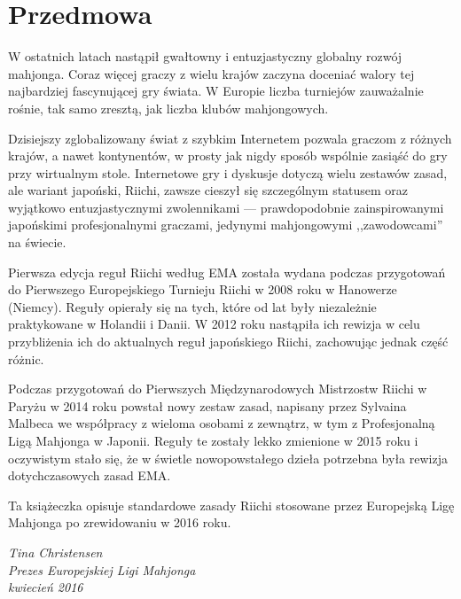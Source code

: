 \section*{Przedmowa}

W ostatnich latach nastąpił gwałtowny i entuzjastyczny globalny rozwój mahjonga.
Coraz więcej graczy z wielu krajów zaczyna doceniać walory tej najbardziej fascynującej gry świata.
W Europie liczba turniejów zauważalnie rośnie, tak samo zresztą, jak liczba klubów mahjongowych.

Dzisiejszy zglobalizowany świat z szybkim Internetem pozwala graczom z różnych krajów, a nawet kontynentów, w prosty jak nigdy sposób wspólnie zasiąść do gry przy wirtualnym stole.
Internetowe gry i dyskusje dotyczą wielu zestawów zasad, ale wariant japoński, Riichi, zawsze cieszył się szczególnym statusem oraz wyjątkowo entuzjastycznymi zwolennikami --- prawdopodobnie zainspirowanymi japońskimi profesjonalnymi graczami, jedynymi mahjongowymi ,,zawodowcami'' na świecie.

Pierwsza edycja reguł Riichi według EMA została wydana podczas przygotowań do Pierwszego Europejskiego Turnieju Riichi w 2008 roku w Hanowerze (Niemcy).
Reguły opierały się na tych, które od lat były niezależnie praktykowane w Holandii i Danii.
W 2012 roku nastąpiła ich rewizja w celu przybliżenia ich do aktualnych reguł japońskiego Riichi, zachowując jednak część różnic.

Podczas przygotowań do Pierwszych Międzynarodowych Mistrzostw Riichi w Paryżu w 2014 roku powstał nowy zestaw zasad, napisany przez Sylvaina Malbeca we współpracy z wieloma osobami z zewnątrz, w tym z Profesjonalną Ligą Mahjonga w Japonii.
Reguły te zostały lekko zmienione w 2015 roku i oczywistym stało się, że w świetle nowopowstałego dzieła potrzebna była rewizja dotychczasowych zasad EMA.

Ta książeczka opisuje standardowe zasady Riichi stosowane przez Europejską Ligę Mahjonga po zrewidowaniu w 2016 roku.

\begin{flushright}
    \emph{
        Tina Christensen\\
        Prezes Europejskiej Ligi Mahjonga\\
        kwiecień 2016
    }
\end{flushright}